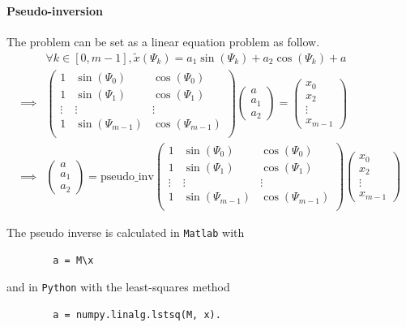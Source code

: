 \paragraph{Pseudo-inversion}
The problem can be set as a linear equation problem as follow.
\begin{align}
&\forall k \in [0,m-1], \tilde{x}(\Psi_k) = a_1 \sin(\Psi_k) + a_2 \cos(\Psi_k) + a \nonumber \\
%
\implies &
\begin{pmatrix}
1 & \sin(\Psi_0) & \cos(\Psi_0) \\
1 & \sin(\Psi_1) & \cos(\Psi_1) \\
\vdots & \vdots & \vdots \\
1 & \sin(\Psi_{m-1}) & \cos(\Psi_{m-1}) \\
\end{pmatrix}
\begin{pmatrix}
a \\ a_1 \\ a_2
\end{pmatrix}
=
\begin{pmatrix}
x_0 \\ x_2 \\ \vdots \\ x_{m-1}
\end{pmatrix} \nonumber
\\
%
\implies &
\begin{pmatrix}
a \\ a_1 \\ a_2
\end{pmatrix}
= 
\mathrm{pseudo\_inv}
\begin{pmatrix}
1 & \sin(\Psi_0) & \cos(\Psi_0) \\
1 & \sin(\Psi_1) & \cos(\Psi_1) \\
\vdots & \vdots & \vdots \\
1 & \sin(\Psi_{m-1}) & \cos(\Psi_{m-1}) \\
\end{pmatrix}
\begin{pmatrix}
x_0 \\ x_2 \\ \vdots \\ x_{m-1}
\end{pmatrix}
\end{align}

The pseudo inverse is calculated in \texttt{Matlab} with 
\begin{verbatim}
        a = M\x
\end{verbatim}
and in \texttt{Python} with the least-squares method
\begin{verbatim}
        a = numpy.linalg.lstsq(M, x).
\end{verbatim}

